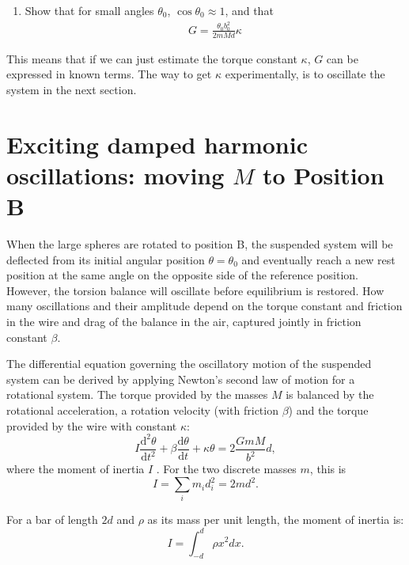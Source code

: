 \documentclass{article}
\begin{document}
\begin{enumerate}[resume]
\item Show that for small angles $\theta_{0}$, $\cos\theta_{0}\approx
  1$, and that%
\begin{align}
  G = \frac{\theta_0b_0^2}{2mMd}\kappa
  \label{eqn:basic}%
\end{align}
\end{enumerate}
This means that if we can just estimate the torque constant $\kappa$,
$G$ can be expressed in known terms. The way to get $\kappa$
experimentally, is to oscillate the system in the next section.

\section*{Exciting damped harmonic oscillations: moving $M$ to Position B}
When the large spheres are rotated to position B, the suspended system
will be deflected from its initial angular position
$\theta=\theta_{0}$ and eventually reach a new rest position at the
same angle on the opposite side of the reference position. However, the
torsion balance will oscillate before equilibrium is restored. How
many oscillations and their amplitude depend on the torque constant
and friction in the wire and drag of the balance in the air, captured
jointly in friction constant $\beta$.

The differential equation governing the oscillatory motion of the
suspended system can be derived by applying Newton's second law of
motion for a rotational system. The torque provided by the masses $M$
is balanced by the rotational acceleration, a rotation velocity (with
friction $\beta$) and the torque provided by the wire with constant
$\kappa$:
\begin{equation}
  I\frac{\mathrm{d}^{2}\theta}{\mathrm{d}t^{2}}+ 
  \beta\frac{\mathrm{d}\theta}{\mathrm{d}t} + \kappa\theta =
  2\frac{GmM}{b^{2}}d,
  \label{eqn:de}
\end{equation}
where the moment of inertia $I$ \cite[Chapter 18
in][]{feynman2013feynman}. For the two discrete masses $m$, this is
\begin{equation}
  I =  \sum_i m_id_i^2 = 2md^2.
  \label{eq:I}
\end{equation}

For a bar of length $2d$ and $\rho$ as its mass per unit length, the
moment of inertia is:
  \begin{equation}
    I =  \int_{-d}^{d} \rho x^2 dx.
    \label{eq:Icont}
\end{equation}
\end{document}
